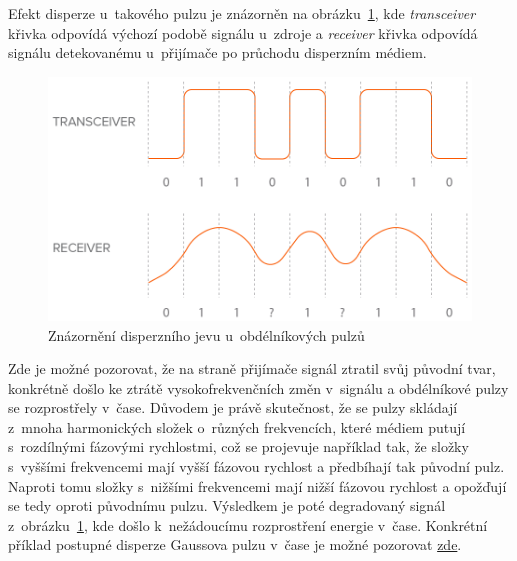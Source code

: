 Efekt disperze u~takového pulzu je znázorněn na
obrázku~\ref{fig:square_wave_disp}, kde
\textit{transceiver} křivka odpovídá výchozí
podobě signálu u~zdroje a \textit{receiver}
křivka odpovídá signálu detekovanému u~přijímače
po průchodu disperzním médiem.
\begin{figure}[htbp]
    \centering
    \includegraphics[scale=0.28]{img/BroadeningSignals.png}
    \caption{Znázornění disperzního jevu u~obdélníkových
    pulzů}
    \label{fig:square_wave_disp}
\end{figure}
Zde je možné pozorovat, že na straně přijímače
signál ztratil svůj původní tvar, konkrétně došlo
ke ztrátě vysokofrekvenčních změn v~signálu a
obdélníkové pulzy se rozprostřely v~čase. Důvodem
je právě skutečnost, že se pulzy skládají z~mnoha
harmonických složek o~různých frekvencích, které
médiem putují s~rozdílnými fázovými rychlostmi, což
se projevuje například tak, že složky s~vyššími
frekvencemi mají vyšší fázovou rychlost a
předbíhají tak původní pulz. Naproti tomu
složky s~nižšími frekvencemi mají nižší
fázovou rychlost a opožďují se tedy oproti
původnímu pulzu. Výsledkem je poté degradovaný
signál z~obrázku~\ref{fig:square_wave_disp},
kde došlo k~nežádoucímu rozprostření energie
v~čase. Konkrétní příklad postupné disperze
Gaussova pulzu v~čase je možné pozorovat \href{https://www.acs.psu.edu/drussell/Demos/Dispersion/dispersion.html}{zde}.

